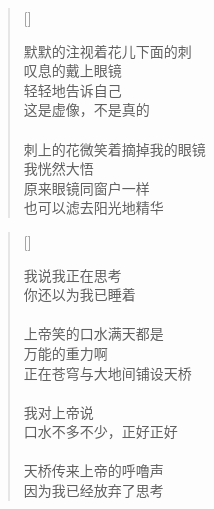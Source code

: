\renewcommand{\poemtoc}{section}
\settowidth{\versewidth}{昨夜我做了一个梦}
\begin{verse}[\versewidth]

默默的注视着花儿下面的刺\\
叹息的戴上眼镜\\
轻轻地告诉自己\\
这是虚像，不是真的\\
~\\
刺上的花微笑着摘掉我的眼镜\\
我恍然大悟\\
原来眼镜同窗户一样\\
也可以滤去阳光地精华\\
\end{verse}
\newpage

\renewcommand{\poemtoc}{section}
\settowidth{\versewidth}{我说我正在思考}
\begin{verse}[\versewidth]

我说我正在思考\\
你还以为我已睡着\\
~\\
上帝笑的口水满天都是\\
万能的重力啊\\
正在苍穹与大地间铺设天桥\\
~\\
我对上帝说\\
口水不多不少，正好正好\\
~\\
天桥传来上帝的呼噜声\\
因为我已经放弃了思考
\end{verse}
